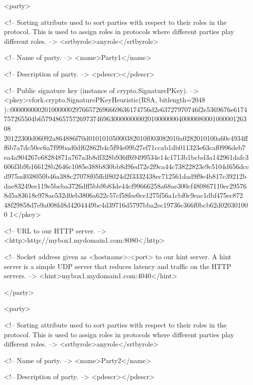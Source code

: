    <party>

      <!-- Sorting attribute used to sort parties with respect to their 
           roles in the protocol. This is used to assign roles in 
           protocols where different parties play different roles. -->
      <srtbyrole>anyrole</srtbyrole>

      <!-- Name of party. -->
      <name>Party1</name>

      <!-- Description of party. -->
      <pdescr></pdescr>

      <!-- Public signature key (instance of crypto.SignaturePKey). -->
      <pkey>vfork.crypto.SignaturePKeyHeuristic(RSA, bitlength=2048
)::00000000020100000029766572696669636174756d2e63727970746f2e5369676e6174
757265504b657948657572697374696300000000020100000004000008000100000126308
20122300d06092a864886f70d01010105000382010f003082010a0282010100a60c4934ff
f6b7a7dc50ec6a7f99bad0df62862b4c5f94e09b27ef71ccab1db011323e63caf0996deb7
ea4a904267e68284871a767a3b8df328b936ff69499534e14c1713b1bcbd3a142961dafc3
606f3b9b166128b2646c1085e388b830bb8d9fed72e2f9ca44c73822823e9c5104d656dcc
d975ad038050b46a388c27078f05ffdf8024d2f3332438ec712561dad9f9e4b817c39212b
dae83249ee119e5beba3726dff5bb9b83de44cf99666258a68ae300cf480867110ec29576
8d5a83618e978ae532d0eb3806a622c57cf58fee0ce1275f56a1cbf0c9eac1dbf475ec872
48f29858d7e9a008fd8d4204449bc4d39716d5797bba2ec19736c366f0bcb62d020301000
1</pkey>

      <!-- URL to our HTTP server. -->
      <http>http://mybox1.mydomain1.com:8080</http>

      <!-- Socket address given as <hostname>:<port> to our hint server. 
           A hint server is a simple UDP server that reduces latency and 
           traffic on the HTTP servers. -->
      <hint>mybox1.mydomain1.com:4040</hint>

   </party>

   <party>

      <!-- Sorting attribute used to sort parties with respect to their 
           roles in the protocol. This is used to assign roles in 
           protocols where different parties play different roles. -->
      <srtbyrole>anyrole</srtbyrole>

      <!-- Name of party. -->
      <name>Party2</name>

      <!-- Description of party. -->
      <pdescr></pdescr>

